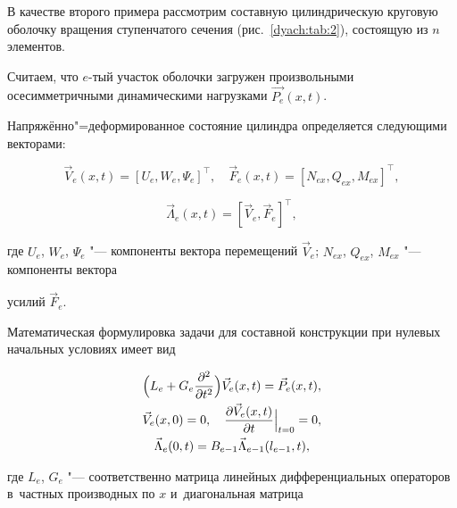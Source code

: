 В качестве второго примера рассмотрим составную цилиндрическую круговую оболочку вращения ступенчатого сечения (рис.~\ref{dyach:tab:2}), состоящую из $n$ элементов.

Считаем, что $e$-тый участок оболочки загружен произвольными осесимметричными динамическими нагрузками $\vec{P_{e}}(x, t)$.

Напряжённо"=деформированное состояние цилиндра определяется следующими векторами:



$$\vec{V}_{e}(x,t)=[U_{e},W_{e},\Psi_{e}]^{\top},\quad  \vec{F}_{e}(x,t)=[N_{ex}, Q_{ex}, M_{ex}]^{\top},$$

\begin{equation}

\label{dyach:6}

\vec{\Lambda}_{e}(x,t)=[\vec{V}_{e},\vec{F}_{e}]^{\top},

\end{equation}

где $U_{e}$, $W_{e}$, $\Psi_{e}$ "--- компоненты вектора перемещений $\vec{V}_{e}$; $N_{ex}$, $Q_{ex}$, $M_{ex}$ "--- компоненты вектора

усилий $\vec{F}_{e}$.




 Математическая формулировка задачи для составной конструкции при нулевых начальных условиях имеет вид

\begin{gather}

\label{dyach:7}

\Bigl(L_{e}+G_{e}\frac{\partial^{2}}{\partial t^{2}}\Bigr)\vec{V}_{e}(x, t)=\vec{P}_{e}(x,t) ,\\

\label{dyach:8}

\vec{V}_{e}(x,0)=0, \quad \frac{\partial\vec{V}_{e}(x,t)}{\partial t}\Big|_{t=0}=0,\\

\label{dyach:9}

\vec{\Lambda}_{e}(0,t)=B_{e-1}\vec{\Lambda}_{e-1}(l_{e-1},t),

\end{gather}

где $L_{e}$, $G_{e}$ "--- соответственно матрица линейных дифференциальных операторов в~частных производных по $x$ и~диагональная матрица


